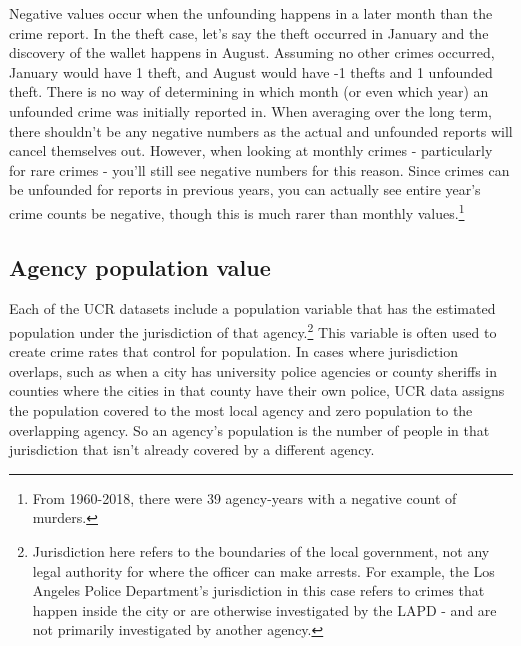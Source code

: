 \documentclass[
  12pt,
  openany]{book}
\begin{document}
Negative values occur when the unfounding happens in a later month than the crime report. In the theft case, let's say the theft occurred in January and the discovery of the wallet happens in August. Assuming no other crimes occurred, January would have 1 theft, and August would have -1 thefts and 1 unfounded theft. There is no way of determining in which month (or even which year) an unfounded crime was initially reported in. When averaging over the long term, there shouldn't be any negative numbers as the actual and unfounded reports will cancel themselves out. However, when looking at monthly crimes - particularly for rare crimes - you'll still see negative numbers for this reason. Since crimes can be unfounded for reports in previous years, you can actually see entire year's crime counts be negative, though this is much rarer than monthly values.\footnote{From 1960-2018, there were 39 agency-years with a negative count of murders.}

\hypertarget{agency-population-value}{%
\subsection{Agency population value}\label{agency-population-value}}

Each of the UCR datasets include a population variable that has the estimated population under the jurisdiction of that agency.\footnote{Jurisdiction here refers to the boundaries of the local government, not any legal authority for where the officer can make arrests. For example, the Los Angeles Police Department's jurisdiction in this case refers to crimes that happen inside the city or are otherwise investigated by the LAPD - and are not primarily investigated by another agency.} This variable is often used to create crime rates that control for population. In cases where jurisdiction overlaps, such as when a city has university police agencies or county sheriffs in counties where the cities in that county have their own police, UCR data assigns the population covered to the most local agency and zero population to the overlapping agency. So an agency's population is the number of people in that jurisdiction that isn't already covered by a different agency.
\end{document}
